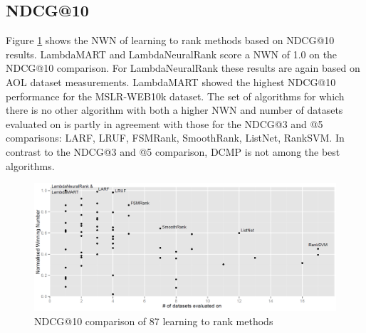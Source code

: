 \documentclass{llncs}
\begin{document}
\subsection{NDCG@10}
Figure \ref{fig:normalized_winning_number_ndcg10} shows the NWN of learning to rank methods based on NDCG@10 results. LambdaMART and LambdaNeuralRank score a NWN of 1.0 on the NDCG@10 comparison. For LambdaNeuralRank these results are again based on AOL dataset measurements. LambdaMART showed the highest NDCG@10 performance for the MSLR-WEB10k dataset. The set of algorithms for which there is no other algorithm with both a higher NWN and number of datasets evaluated on is partly in agreement with those for the NDCG@3 and @5 comparisons: {LARF, LRUF, FSMRank, SmoothRank, ListNet, RankSVM}. In contrast to the NDCG@3 and @5 comparison, DCMP is not among the best algorithms.
\vspace{-0.08in}
\begin{figure}
\centering
\includegraphics[scale=0.19]{gfx/ndcg10_winnum}
\caption{NDCG@10 comparison of 87 learning to rank methods}
\label{fig:normalized_winning_number_ndcg10}
\end{figure}
\vspace{-0.1in}
\end{document}
